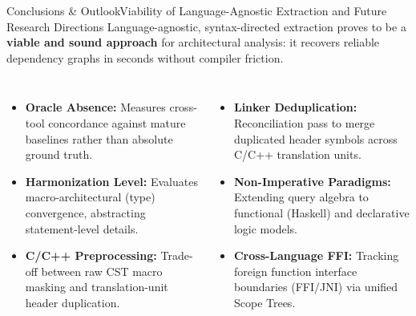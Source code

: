 \documentclass[aspectratio=169,10pt]{beamer}
\begin{document}
\begin{frame}{Conclusions \& Outlook}{Viability of Language-Agnostic Extraction and Future Research Directions}
  \centering
  Language-agnostic, syntax-directed extraction proves to be a \textbf{viable and sound approach} for architectural analysis:
  it recovers reliable dependency graphs in seconds without compiler friction.\par
  \vspace{0.8em}

  \begin{columns}[T,onlytextwidth]
      \par\vspace{0.15em}
      {\small
      \begin{itemize}\setlength{\itemsep}{0.35em}
        \item \textbf{Oracle Absence:} Measures cross-tool concordance against mature baselines rather than absolute ground truth.
        \item \textbf{Harmonization Level:} Evaluates macro-architectural (type) convergence, abstracting statement-level details.
        \item \textbf{C/C++ Preprocessing:} Trade-off between raw CST macro masking and translation-unit header duplication.
      \end{itemize}\par}

      \par\vspace{0.15em}
      {\small
      \begin{itemize}\setlength{\itemsep}{0.35em}
        \item \textbf{Linker Deduplication:} Reconciliation pass to merge duplicated header symbols across C/C++ translation units.
        \item \textbf{Non-Imperative Paradigms:} Extending query algebra to functional (Haskell) and declarative logic models.
        \item \textbf{Cross-Language FFI:} Tracking foreign function interface boundaries (FFI/JNI) via unified Scope Trees.
      \end{itemize}\par}
  \end{columns}
  \vspace{0.35em}
\end{frame}
\end{document}

